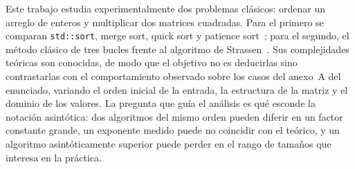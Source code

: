 
Este trabajo estudia experimentalmente dos problemas clásicos: ordenar un
arreglo de enteros y multiplicar dos matrices cuadradas. Para el primero se
comparan \texttt{std::sort}, merge sort, quick sort y patience
sort~\cite{taocv3,clrs}; para el segundo, el método clásico de tres bucles
frente al algoritmo de Strassen~\cite{strassen1969}. Sus complejidades teóricas
son conocidas, de modo que el objetivo no es deducirlas sino contrastarlas con
el comportamiento observado sobre los casos del anexo~A del enunciado, variando
el orden inicial de la entrada, la estructura de la matriz y el dominio de los
valores. La pregunta que guía el análisis es qué esconde la notación
asintótica: dos algoritmos del mismo orden pueden diferir en un factor
constante grande, un exponente medido puede no coincidir con el teórico, y un
algoritmo asintóticamente superior puede perder en el rango de tamaños que
interesa en la práctica.
